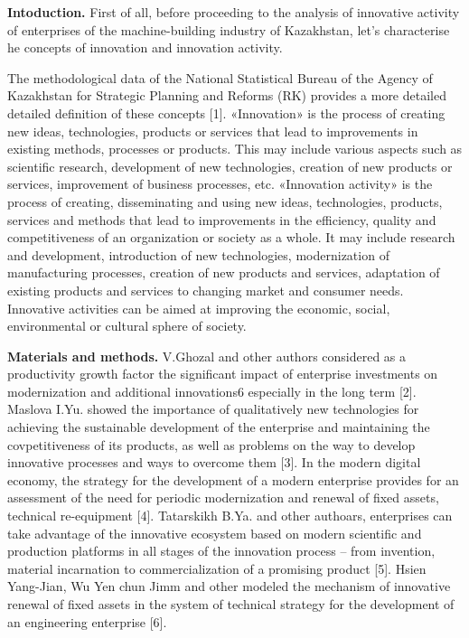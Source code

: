 \begin{multicols}{2}
{\bfseries Intoduction.} First of all, before proceeding to the analysis of
innovative activity of enterprises of the machine-building industry of
Kazakhstan, let's characterise he concepts of innovation and innovation
activity.

The methodological data of the National Statistical Bureau of the Agency
of Kazakhstan for Strategic Planning and Reforms (RK) provides a more
detailed detailed definition of these concepts {[}1{]}. «Innovation» is
the process of creating new ideas, technologies, products or services
that lead to improvements in existing methods, processes or products.
This may include various aspects such as scientific research,
development of new technologies, creation of new products or services,
improvement of business processes, etc. «Innovation activity» is the
process of creating, disseminating and using new ideas, technologies,
products, services and methods that lead to improvements in the
efficiency, quality and competitiveness of an organization or society as
a whole. It may include research and development, introduction of new
technologies, modernization of manufacturing processes, creation of new
products and services, adaptation of existing products and services to
changing market and consumer needs. Innovative activities can be aimed
at improving the economic, social, environmental or cultural sphere of
society.

{\bfseries Materials and methods.} V.Ghozal and other authors considered as
a productivity growth factor the significant impact of enterprise
investments on modernization and additional innovations6 especially in
the long term {[}2{]}. Maslova I.Yu. showed the importance of
qualitatively new technologies for achieving the sustainable development
of the enterprise and maintaining the covpetitiveness of its products,
as well as problems on the way to develop innovative processes and ways
to overcome them {[}3{]}. In the modern digital economy, the strategy
for the development of a modern enterprise provides for an assessment of
the need for periodic modernization and renewal of fixed assets,
technical re-equipment {[}4{]}. Tatarskikh B.Ya. and other authoars,
enterprises can take advantage of the innovative ecosystem based on
modern scientific and production platforms in all stages of the
innovation process -- from invention, material incarnation to
commercialization of a promising product {[}5{]}. Hsien Yang-Jian, Wu
Yen chun Jimm and other modeled the mechanism of innovative renewal of
fixed assets in the system of technical strategy for the development of
an engineering enterprise {[}6{]}.


\end{multicols}
